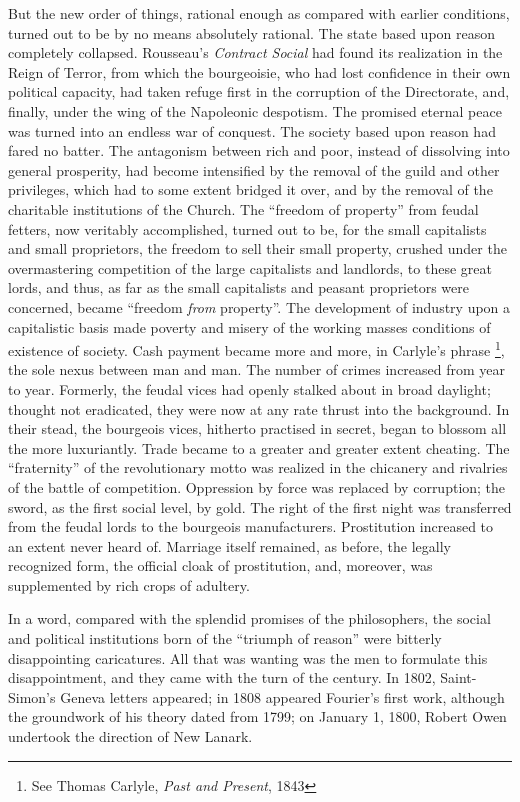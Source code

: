 But the new order of things, rational enough as compared with earlier
conditions, turned out to be by no means absolutely rational. The state based
upon reason completely collapsed. Rousseau's \emph{Contract Social} had found
its realization in the Reign of Terror, from which the bourgeoisie, who had lost
confidence in their own political capacity, had taken refuge first in the
corruption of the Directorate, and, finally, under the wing of the Napoleonic
despotism. The promised eternal peace was turned into an endless war of
conquest. The society based upon reason had fared no batter. The antagonism
between rich and poor, instead of dissolving into general prosperity, had become
intensified by the removal of the guild and other privileges, which had to some
extent bridged it over, and by the removal of the charitable institutions of the
Church. The ``freedom of property'' from feudal fetters, now veritably
accomplished, turned out to be, for the small capitalists and small proprietors,
the freedom to sell their small property, crushed under the overmastering
competition of the large capitalists and landlords, to these great lords, and
thus, as far as the small capitalists and peasant proprietors were concerned,
became ``freedom \emph{from} property''. The development of industry upon a
capitalistic basis made poverty and misery of the working masses conditions of
existence of society. Cash payment became more and more, in Carlyle's phrase%
\footnote{See Thomas Carlyle, \emph{Past and Present}, 1843}, the sole nexus
between man and man. The number of crimes increased from year to year. Formerly,
the feudal vices had openly stalked about in broad daylight; thought not
eradicated, they were now at any rate thrust into the background. In their
stead, the bourgeois vices, hitherto practised in secret, began to blossom all
the more luxuriantly. Trade became to a greater and greater extent cheating. The
``fraternity'' of the revolutionary motto was realized in the chicanery and
rivalries of the battle of competition. Oppression by force was replaced by
corruption; the sword, as the first social level, by gold. The right of the
first night was transferred from the feudal lords to the bourgeois
manufacturers. Prostitution increased to an extent never heard of. Marriage
itself remained, as before, the legally recognized form, the official cloak of
prostitution, and, moreover, was supplemented by rich crops of adultery.

In a word, compared with the splendid promises of the philosophers, the social
and political institutions born of the ``triumph of reason'' were bitterly
disappointing caricatures. All that was wanting was the men to formulate this
disappointment, and they came with the turn of the century. In 1802,
Saint-Simon's Geneva letters appeared; in 1808 appeared Fourier's first work,
although the groundwork of his theory dated from 1799; on January 1, 1800,
Robert Owen undertook the direction of New Lanark.

